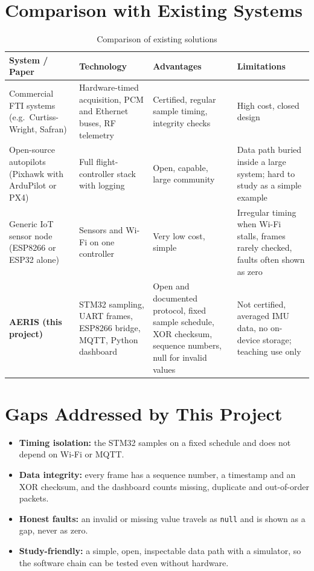 \documentclass[12pt,a4paper]{report}
\begin{document}
\section{Comparison with Existing Systems}
\begin{table}[htbp]
\centering
\caption{Comparison of existing solutions}
\label{tab:compare}
\small
\begin{tabularx}{\textwidth}{>{\raggedright\arraybackslash}p{2.6cm}>{\raggedright\arraybackslash}XXX}
\toprule
\textbf{System / Paper} & \textbf{Technology} & \textbf{Advantages} & \textbf{Limitations}\\
\midrule
Commercial FTI systems (e.g.\ Curtiss-Wright, Safran) & Hardware-timed acquisition, PCM and Ethernet buses, RF telemetry & Certified, regular sample timing, integrity checks & High cost, closed design\\
Open-source autopilots (Pixhawk with ArduPilot or PX4) & Full flight-controller stack with logging & Open, capable, large community & Data path buried inside a large system; hard to study as a simple example\\
Generic IoT sensor node (ESP8266 or ESP32 alone) & Sensors and Wi-Fi on one controller & Very low cost, simple & Irregular timing when Wi-Fi stalls, frames rarely checked, faults often shown as zero\\
\textbf{AERIS (this project)} & STM32 sampling, UART frames, ESP8266 bridge, MQTT, Python dashboard & Open and documented protocol, fixed sample schedule, XOR checksum, sequence numbers, null for invalid values & Not certified, averaged IMU data, no on-device storage; teaching use only\\
\bottomrule
\end{tabularx}
\end{table}

\section{Gaps Addressed by This Project}
\begin{itemize}
\item \textbf{Timing isolation:} the STM32 samples on a fixed schedule and does not depend on Wi-Fi or MQTT.
\item \textbf{Data integrity:} every frame has a sequence number, a timestamp and an XOR checksum, and the dashboard counts missing, duplicate and out-of-order packets.
\item \textbf{Honest faults:} an invalid or missing value travels as \texttt{null} and is shown as a gap, never as zero.
\item \textbf{Study-friendly:} a simple, open, inspectable data path with a simulator, so the software chain can be tested even without hardware.
\end{itemize}
\end{document}
